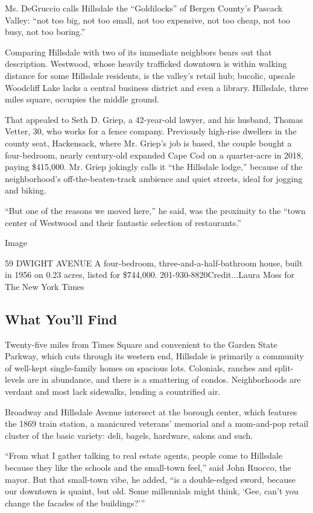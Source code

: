 Ms. DeGruccio calls Hillsdale the ``Goldilocks'' of Bergen County's
Pascack Valley: ``not too big, not too small, not too expensive, not too
cheap, not too busy, not too boring.''

Comparing Hillsdale with two of its immediate neighbors bears out that
description. Westwood, whose heavily trafficked downtown is within
walking distance for some Hillsdale residents, is the valley's retail
hub; bucolic, upscale Woodcliff Lake lacks a central business district
and even a library. Hillsdale, three miles square, occupies the middle
ground.

That appealed to Seth D. Griep, a 42-year-old lawyer, and his husband,
Thomas Vetter, 30, who works for a fence company. Previously high-rise
dwellers in the county seat, Hackensack, where Mr. Griep's job is based,
the couple bought a four-bedroom, nearly century-old expanded Cape Cod
on a quarter-acre in 2018, paying \$415,000. Mr. Griep jokingly calls it
``the Hillsdale lodge,'' because of the neighborhood's
off-the-beaten-track ambience and quiet streets, ideal for jogging and
biking.

``But one of the reasons we moved here,'' he said, was the proximity to
the ``town center of Westwood and their fantastic selection of
restaurants.''

Image

59 DWIGHT AVENUE \textbar{} A four-bedroom, three-and-a-half-bathroom
house, built in 1956 on 0.23 acres, listed for \$744,000.
201-930-8820Credit...Laura Moss for The New York Times

\hypertarget{what-youll-find}{%
\subsection{What You'll Find}\label{what-youll-find}}

Twenty-five miles from Times Square and convenient to the Garden State
Parkway, which cuts through its western end, Hillsdale is primarily a
community of well-kept single-family homes on spacious lots. Colonials,
ranches and split-levels are in abundance, and there is a smattering of
condos. Neighborhoods are verdant and most lack sidewalks, lending a
countrified air.

Broadway and Hillsdale Avenue intersect at the borough center, which
features the 1869 train station, a manicured veterans' memorial and a
mom-and-pop retail cluster of the basic variety: deli, bagels, hardware,
salons and such.

``From what I gather talking to real estate agents, people come to
Hillsdale because they like the schools and the small-town feel,'' said
John Ruocco, the mayor. But that small-town vibe, he added, ``is a
double-edged sword, because our downtown is quaint, but old. Some
millennials might think, `Gee, can't you change the facades of the
buildings?'''

